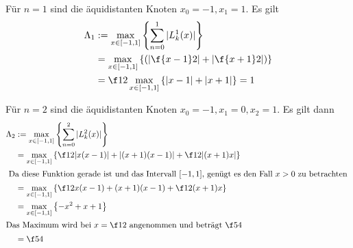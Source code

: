 \documentclass[a4paper]{scrartcl}
\begin{document}
\begin{aufgabe}~

	Für $n=1$ sind die äquidistanten Knoten $x_0=-1, x_1=1$.
	Es gilt
	\begin{align*}
		\Lambda_1 
		&:= \max_{x\in [-1,1]} \left\{\sum_{n=0}^1 |L_k^{1}(x)| \right\}\\
		&= \max_{x\in [-1,1]} \left\{\left(\left|\f{x-1}2\right| + \left|\f{x+1}2\right|\right)\right\}\\
		&= \f 12 \max_{x\in [-1,1]} \left\{ |x-1| + |x+1|\right\} = 1
	\end{align*}
	
	Für $n=2$ sind die äquidistanten Knoten $x_0=-1,x_1=0,x_2=1$.
	Es gilt dann
	\begin{align*}
		\Lambda_2
		&:= \max_{x\in [-1,1]} \left\{\sum_{n=0}^2 |L_k^{2}(x)|\right\} \\
		&= \max_{x\in [-1,1]} \left\{ \f12 |x(x-1)| + |(x+1)(x-1)| + \f 12 |(x+1)x|\right\} \\
	\intertext{
		Da diese Funktion gerade ist und das Intervall $[-1,1]$, genügt es den Fall $x>0$ zu betrachten
	}
		&= \max_{x\in [-1,1]} \left\{ \f12 x(x-1) + (x+1)(x-1) + \f 12 (x+1)x\right\} \\
		&= \max_{x\in [-1,1]} \left\{ -x^2 +x+1\right\} \\
	\intertext{Das Maximum wird bei $x=\f 12$ angenommen und beträgt $\f 54$}
		&= \f 54
	\end{align*}
\end{aufgabe}
\end{document}
